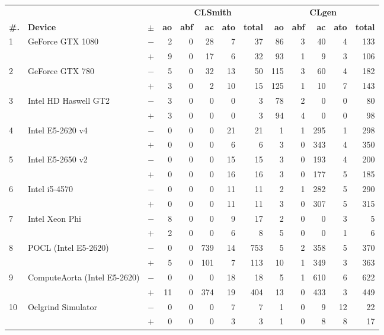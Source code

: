   \begin{tabular}{lll | rrrrr | rrrrr }
  \toprule
  & & & \multicolumn{5}{c|}{\textbf{CLSmith}} & \multicolumn{5}{c}{\textbf{CLgen}} \\
  \textbf{\#.} & \textbf{Device} & $\pm$ &
  \textbf{ao} & \textbf{abf} & \textbf{ac} & \textbf{ato} & \textbf{total} &
  \textbf{ao} & \textbf{abf} & \textbf{ac} & \textbf{ato} & \textbf{total} \\
  \midrule
  \multirow{ 2}{*}{1} & \multirow{ 2}{*}{GeForce GTX 1080} & $-$ & 2 & 0 & 28 & 7 & 37       & 86 & 3 & 40 & 4 & 133 \\& & $+$ & 9 & 0 & 17 & 6 & 32 & 93 & 1 & 9 & 3 & 106 \\
\hline
\multirow{ 2}{*}{2} & \multirow{ 2}{*}{GeForce GTX 780} & $-$ & 5 & 0 & 32 & 13 & 50       & 115 & 3 & 60 & 4 & 182 \\& & $+$ & 3 & 0 & 2 & 10 & 15 & 125 & 1 & 10 & 7 & 143 \\
\hline
\multirow{ 2}{*}{3} & \multirow{ 2}{*}{Intel HD Haswell GT2} & $-$ & 3 & 0 & 0 & 0 & 3       & 78 & 2 & 0 & 0 & 80 \\& & $+$ & 3 & 0 & 0 & 0 & 3 & 94 & 4 & 0 & 0 & 98 \\
\hline
\multirow{ 2}{*}{4} & \multirow{ 2}{*}{Intel E5-2620 v4} & $-$ & 0 & 0 & 0 & 21 & 21       & 1 & 1 & 295 & 1 & 298 \\& & $+$ & 0 & 0 & 0 & 6 & 6 & 3 & 0 & 343 & 4 & 350 \\
\hline
\multirow{ 2}{*}{5} & \multirow{ 2}{*}{Intel E5-2650 v2} & $-$ & 0 & 0 & 0 & 15 & 15       & 3 & 0 & 193 & 4 & 200 \\& & $+$ & 0 & 0 & 0 & 16 & 16 & 3 & 0 & 177 & 5 & 185 \\
\hline
\multirow{ 2}{*}{6} & \multirow{ 2}{*}{Intel i5-4570} & $-$ & 0 & 0 & 0 & 11 & 11       & 2 & 1 & 282 & 5 & 290 \\& & $+$ & 0 & 0 & 0 & 11 & 11 & 3 & 0 & 307 & 5 & 315 \\
\hline
\multirow{ 2}{*}{7} & \multirow{ 2}{*}{Intel Xeon Phi} & $-$ & 8 & 0 & 0 & 9 & 17       & 2 & 0 & 0 & 3 & 5 \\& & $+$ & 2 & 0 & 0 & 6 & 8 & 5 & 0 & 0 & 1 & 6 \\
\hline
\multirow{ 2}{*}{8} & \multirow{ 2}{*}{POCL (Intel E5-2620)} & $-$ & 0 & 0 & 739 & 14 & 753       & 5 & 2 & 358 & 5 & 370 \\& & $+$ & 5 & 0 & 101 & 7 & 113 & 10 & 1 & 349 & 3 & 363 \\
\hline
\multirow{ 2}{*}{9} & \multirow{ 2}{*}{ComputeAorta (Intel E5-2620)} & $-$ & 0 & 0 & 0 & 18 & 18       & 5 & 1 & 610 & 6 & 622 \\& & $+$ & 11 & 0 & 374 & 19 & 404 & 13 & 0 & 433 & 3 & 449 \\
\hline
\multirow{ 2}{*}{10} & \multirow{ 2}{*}{Oclgrind Simulator} & $-$ & 0 & 0 & 0 & 7 & 7       & 1 & 0 & 9 & 12 & 22 \\& & $+$ & 0 & 0 & 0 & 3 & 3 & 1 & 0 & 8 & 8 & 17 \\
  \bottomrule
\end{tabular}

